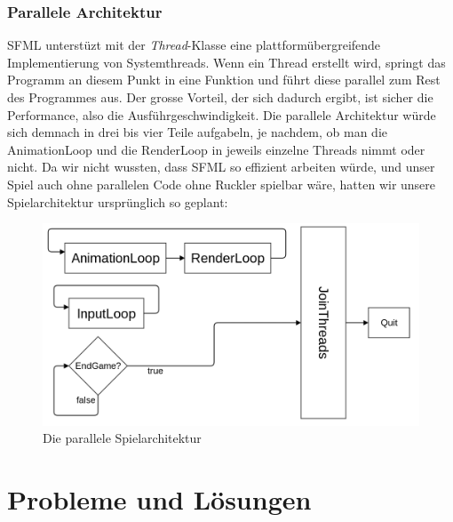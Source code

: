 \documentclass[12pt,a4paper]{scrartcl}
\begin{document}
\subsubsection{Parallele Architektur}
SFML unterstüzt mit der \textit{Thread}-Klasse eine plattformübergreifende Implementierung
von Systemthreads. Wenn ein Thread erstellt wird, springt das Programm an diesem Punkt
in eine Funktion und führt diese parallel zum Rest des Programmes aus. Der grosse Vorteil,
der sich dadurch ergibt, ist sicher die Performance, also die Ausführgeschwindigkeit. Die
parallele Architektur würde sich demnach in drei bis vier Teile aufgabeln, je nachdem, ob man die AnimationLoop
und die RenderLoop in jeweils einzelne Threads nimmt oder nicht. Da wir
nicht wussten, dass SFML so effizient arbeiten würde, und unser Spiel auch ohne parallelen Code
ohne Ruckler spielbar wäre, hatten wir unsere Spielarchitektur ursprünglich so geplant:
\\
\begin{figure}[h]
\centering
\includegraphics[scale=0.3]{img/threads.png}
\caption{Die parallele Spielarchitektur}
\end{figure}


\section{Probleme und Lösungen} 	
\end{document}

